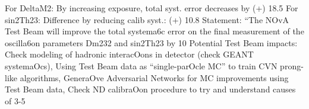 \documentclass[12pt,a4paper]{article}
\begin{document}
For DeltaM2: By increasing exposure, total syst. error decreases by (+) 18.5%
For sin2Th23: Difference by reducing calib syst.: (+) 10.8%
Statement: “The NOvA Test Beam will improve the total systema6c error on the final measurement of the oscilla6on parameters Dm232 and sin2Th23 by 10%
Potential Test Beam impacts: Check modeling of hadronic interacOons in detector (check GEANT systemaOcs), Using Test Beam data as “single-parOcle MC” to train CVN prong-like algorithms, GeneraOve Adversarial Networks for MC improvements using Test Beam data, Check ND calibraOon procedure to try and understand causes of 3-5%
\end{document}
